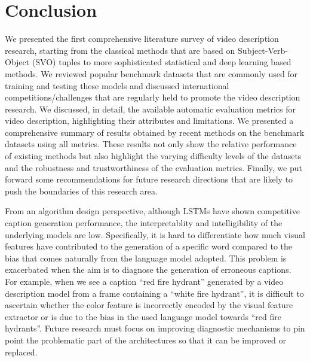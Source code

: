 \documentclass[10pt,journal,compsoc]{IEEEtran}
\begin{document}
\vspace{-2mm}
\section{Conclusion}
\label{sec:conc}
We presented the first comprehensive literature survey of video description research, starting from the classical methods that are based on Subject-Verb-Object (SVO) tuples to more sophisticated statistical and deep learning based methods.  We reviewed popular benchmark datasets that are commonly used for training and testing these models and discussed international competitions/challenges that are regularly held to promote the video description research. We discussed, in detail, the available automatic evaluation metrics for video description, highlighting their attributes and limitations. We presented a comprehensive summary of results obtained by recent methods on the benchmark datasets using all metrics. These results not only show the relative performance of existing methods but also highlight the varying difficulty levels of the datasets and the robustness and trustworthiness of the evaluation metrics. Finally, we put forward some recommendations for future research directions that are likely to push the boundaries of this research area.


From an algorithm design perspective, although LSTMs have shown competitive caption generation performance, the interpretablity and intelligibility of the underlying models are low. Specifically, it is hard to differentiate how much visual features have contributed to the generation of a specific word compared to the bias that comes naturally from the language model adopted. This problem is exacerbated when the aim is to diagnose the generation of erroneous captions. For example, when we see a caption ``red fire hydrant'' generated by a video description model from a frame containing a ``white fire hydrant'', it is difficult to ascertain whether the color feature is incorrectly encoded by the visual feature extractor or is due to the bias in the used language model towards ``red fire hydrants''. Future research must focus on improving diagnostic mechanisms to pin point the problematic part of the architectures so that it can be improved or replaced. 
\end{document}
